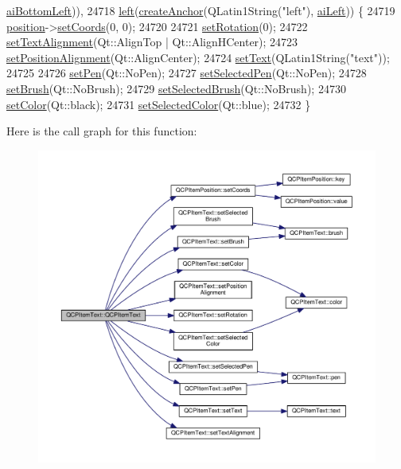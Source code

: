 \begin{DoxyCode}
      \hyperlink{class_q_c_p_item_text_a14a84e58f72519c8ae1d7a4a1dd23f21a489ec73da5a18c15e98a4f9b17ed301f}{aiBottomLeft})),
24718       \hyperlink{class_q_c_p_item_text_ab8c6c6e1df36256986fab1463c0a1d38}{left}(\hyperlink{class_q_c_p_abstract_item_af3fc92527802078ca395138748b629a7}{createAnchor}(QLatin1String(\textcolor{stringliteral}{"left"}), \hyperlink{class_q_c_p_item_text_a14a84e58f72519c8ae1d7a4a1dd23f21a7f1c1b8c574c753e300a4759915a9170}{aiLeft})) \{
24719   \hyperlink{class_q_c_p_item_text_a0d228a00e819022b5690c65762721129}{position}->\hyperlink{class_q_c_p_item_position_aa988ba4e87ab684c9021017dcaba945f}{setCoords}(0, 0);
24720 
24721   \hyperlink{class_q_c_p_item_text_a4bcc10cd97952c3f749d75824b5077f0}{setRotation}(0);
24722   \hyperlink{class_q_c_p_item_text_ab5bc0684c4d1bed81949a11b34dba478}{setTextAlignment}(Qt::AlignTop | Qt::AlignHCenter);
24723   \hyperlink{class_q_c_p_item_text_a781cdf8c640fc6a055dcff1e675c8c7a}{setPositionAlignment}(Qt::AlignCenter);
24724   \hyperlink{class_q_c_p_item_text_a3dacdda0ac88f99a05b333b977c48747}{setText}(QLatin1String(\textcolor{stringliteral}{"text"}));
24725 
24726   \hyperlink{class_q_c_p_item_text_a9b9ec6eea0eb0603977ff84d4c78d0a3}{setPen}(Qt::NoPen);
24727   \hyperlink{class_q_c_p_item_text_a291febe586f0da3f1c392e77bef4aa20}{setSelectedPen}(Qt::NoPen);
24728   \hyperlink{class_q_c_p_item_text_a1c7e131516df2ed8d941ef31240ded8e}{setBrush}(Qt::NoBrush);
24729   \hyperlink{class_q_c_p_item_text_a6b8377eeb2af75eb9528422671ac16cb}{setSelectedBrush}(Qt::NoBrush);
24730   \hyperlink{class_q_c_p_item_text_aa51efc0841fe52da9eaf8aff6fc8a8b2}{setColor}(Qt::black);
24731   \hyperlink{class_q_c_p_item_text_ae7ba0bdb75c897b028388e45bfd435fa}{setSelectedColor}(Qt::blue);
24732 \}
\end{DoxyCode}


Here is the call graph for this function\+:\nopagebreak
\begin{figure}[H]
\begin{center}
\leavevmode
\includegraphics[width=350pt]{class_q_c_p_item_text_a77ff96a2972a00872ff8f8c67143abbe_cgraph}
\end{center}
\end{figure}


